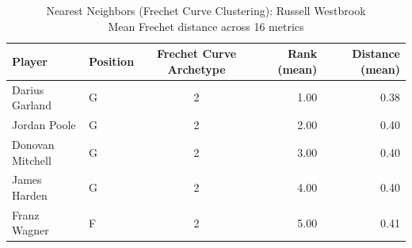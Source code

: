 \begin{table}[t]
\caption*{
{\fontsize{20}{25} Nearest Neighbors (Frechet Curve Clustering): Russell Westbrook\fontsize{12}{15}\selectfont } \\ 
{\fontsize{14}{17}\selectfont  Mean Frechet distance across 16 metrics\fontsize{12}{15}\selectfont }
} 
\fontsize{12.0pt}{14.0pt}\selectfont
\begin{tabular*}{\linewidth}{@{\extracolsep{\fill}}llcrr}
\toprule
Player & Position & Frechet Curve Archetype & Rank (mean) & Distance (mean) \\ 
\midrule\addlinespace[2.5pt]
Darius Garland & G & 2 & 1.00 & 0.38 \\ 
Jordan Poole & G & 2 & 2.00 & 0.40 \\ 
Donovan Mitchell & G & 2 & 3.00 & 0.40 \\ 
James Harden & G & 2 & 4.00 & 0.40 \\ 
Franz Wagner & F & 2 & 5.00 & 0.41 \\ 
\bottomrule
\end{tabular*}
\end{table}

